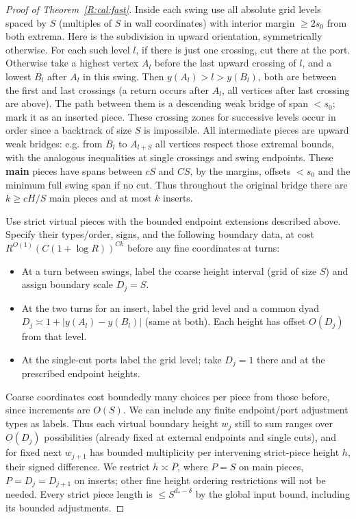 \begin{proof}[Proof of Theorem~\ref{R:cal:fast}]
Inside each swing use all absolute grid levels spaced by \(S\) (multiples of \(S\) in wall coordinates) with interior margin \(\ge 2s_0\) from both extrema. Here is the subdivision in upward orientation, symmetrically otherwise. For each such level \(l\), if there is just one crossing, cut there at the port. Otherwise take a highest vertex \(A_l\) before the last upward crossing of \(l\), and a lowest \(B_l\) after \(A_l\) in this swing. Then \(y(A_l)>l>y(B_l)\), both are between the first and last crossings (a return occurs after \(A_l\), all vertices after last crossing are above). The path between them is a descending weak bridge of span \(<s_0\); mark it as an inserted piece. These crossing zones for successive levels occur in order since a backtrack of size \(S\) is impossible. All intermediate pieces are upward weak bridges: e.g. from \(B_l\) to \(A_{l+S}\) all vertices respect those extremal bounds, with the analogous inequalities at single crossings and swing endpoints. These \textbf{main} pieces have spans between \(c S\) and \(C S\), by the margins, offsets \(<s_0\) and the minimum full swing span if no cut. Thus throughout the original bridge there are \(k\ge c H/S\) main pieces and at most \(k\) inserts.

Use strict virtual pieces with the bounded endpoint extensions described above. Specify their types/order, signs, and the following boundary data, at cost \(R^{O(1)}(C(1+\log R))^{C k}\) before any fine coordinates at turns:
\begin{itemize}
\item At a turn between swings, label the coarse height interval (grid of size \(S\)) and assign boundary scale \(D_j=S\).
\item At the two turns for an insert, label the grid level and a common dyad \(D_j\asymp 1+|y(A_l)-y(B_l)|\) (same at both). Each height has offset \(O(D_j)\) from that level.
\item At the single-cut ports label the grid level; take \(D_j=1\) there and at the prescribed endpoint heights.
\end{itemize}

Coarse coordinates cost boundedly many choices per piece from those before, since increments are \(O(S)\). We can include any finite endpoint/port adjustment types as labels. Thus each virtual boundary height \(w_j\) still to sum ranges over \(O(D_j)\) possibilities (already fixed at external endpoints and single cuts), and for fixed next \(w_{j+1}\) has bounded multiplicity per intervening strict-piece height \(h\), their signed difference. We restrict \(h\asymp P\), where \(P=S\) on main pieces, \(P=D_j=D_{j+1}\) on inserts; other fine height ordering restrictions will not be needed. Every strict piece length is \(\le S^{d_*-\delta}\) by the global input bound, including its bounded adjustments.


\end{proof}
